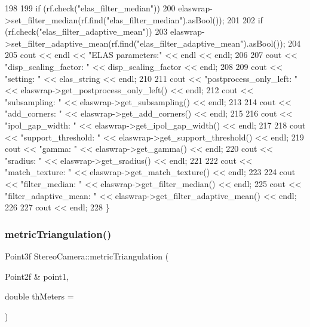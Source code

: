 \begin{DoxyCode}
198 
199     \textcolor{keywordflow}{if} (rf.check(\textcolor{stringliteral}{"elas\_filter\_median"}))
200         elaswrap->set\_filter\_median(rf.find(\textcolor{stringliteral}{"elas\_filter\_median"}).asBool());
201 
202     \textcolor{keywordflow}{if} (rf.check(\textcolor{stringliteral}{"elas\_filter\_adaptive\_mean"}))
203         elaswrap->set\_filter\_adaptive\_mean(rf.find(\textcolor{stringliteral}{"elas\_filter\_adaptive\_mean"}).asBool());
204 
205     cout << endl << \textcolor{stringliteral}{"ELAS parameters:"} << endl << endl;
206 
207     cout << \textcolor{stringliteral}{"disp\_scaling\_factor: "} << disp\_scaling\_factor << endl;
208 
209     cout << \textcolor{stringliteral}{"setting: "} << elas\_string << endl;
210 
211     cout << \textcolor{stringliteral}{"postprocess\_only\_left: "} << elaswrap->get\_postprocess\_only\_left() << endl;
212     cout << \textcolor{stringliteral}{"subsampling: "} << elaswrap->get\_subsampling() << endl;
213 
214     cout << \textcolor{stringliteral}{"add\_corners: "} << elaswrap->get\_add\_corners() << endl;
215 
216     cout << \textcolor{stringliteral}{"ipol\_gap\_width: "} << elaswrap->get\_ipol\_gap\_width() << endl;
217 
218     cout << \textcolor{stringliteral}{"support\_threshold: "} << elaswrap->get\_support\_threshold() << endl;
219     cout << \textcolor{stringliteral}{"gamma: "} << elaswrap->get\_gamma() << endl;
220     cout << \textcolor{stringliteral}{"sradius: "} << elaswrap->get\_sradius() << endl;
221 
222     cout << \textcolor{stringliteral}{"match\_texture: "} << elaswrap->get\_match\_texture() << endl;
223 
224     cout << \textcolor{stringliteral}{"filter\_median: "} << elaswrap->get\_filter\_median() << endl;
225     cout << \textcolor{stringliteral}{"filter\_adaptive\_mean: "} << elaswrap->get\_filter\_adaptive\_mean() << endl;
226 
227     cout << endl;
228 \}
\end{DoxyCode}
\mbox{\label{classStereoCamera_a2fcd3e1767bcf04716b0e2ac76098430}} 
\subsubsection{\texorpdfstring{metric\+Triangulation()}{metricTriangulation()}\hspace{0.1cm}{\footnotesize\ttfamily [1/2]}}
{\footnotesize\ttfamily Point3f Stereo\+Camera\+::metric\+Triangulation (\begin{DoxyParamCaption}\item[{Point2f \&}]{point1,  }\item[{double}]{th\+Meters = {} }\end{DoxyParamCaption})}




